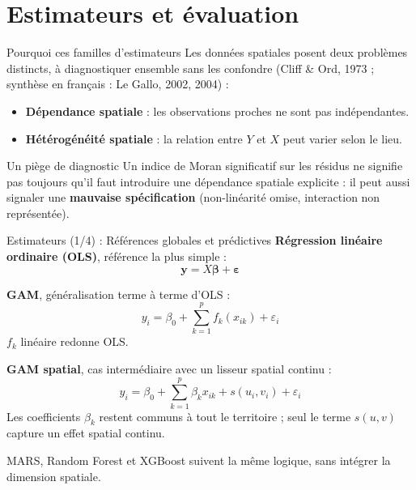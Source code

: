 \documentclass[aspectratio=169,11pt]{beamer}
\begin{document}
\section{Estimateurs et évaluation}
\begin{frame}{Pourquoi ces familles d'estimateurs}
\small
Les données spatiales posent deux problèmes distincts, à diagnostiquer
ensemble sans les confondre (Cliff \& Ord, 1973 ; synthèse en français :
Le Gallo, 2002, 2004) :
\begin{itemize}
    \item \textbf{Dépendance spatiale} : les observations proches ne sont pas indépendantes.
    \item \textbf{Hétérogénéité spatiale} : la relation entre $Y$ et $X$ peut varier selon le lieu.
\end{itemize}
\vspace{0.3cm}
\begin{block}{Un piège de diagnostic}
Un indice de Moran significatif sur les résidus ne signifie pas toujours
qu'il faut introduire une dépendance spatiale explicite : il peut aussi
signaler une \textbf{mauvaise spécification} (non-linéarité omise,
interaction non représentée).
\end{block}
\end{frame}

\begin{frame}{Estimateurs (1/4) : Références globales et prédictives}
\footnotesize
\textbf{Régression linéaire ordinaire (OLS)}, référence la plus simple :
\[
\mathbf{y}=X\boldsymbol{\beta}+\boldsymbol{\varepsilon}
\]

\textbf{GAM}, généralisation terme à terme d'OLS :
\[
y_i=\beta_0+\sum_{k=1}^{p} f_k(x_{ik})+\varepsilon_i
\]
$f_k$ linéaire redonne OLS.

\textbf{GAM spatial}, cas intermédiaire avec un lisseur spatial continu :
\[
y_i=\beta_0+\sum_{k=1}^{p}\beta_kx_{ik}+s(u_i,v_i)+\varepsilon_i
\]
Les coefficients $\beta_k$ restent communs à tout le territoire ; seul le
terme $s(u,v)$ capture un effet spatial continu.
\vspace{0.15cm}

MARS, Random Forest et XGBoost suivent la même logique, sans intégrer la
dimension spatiale.
\end{frame}
\end{document}
